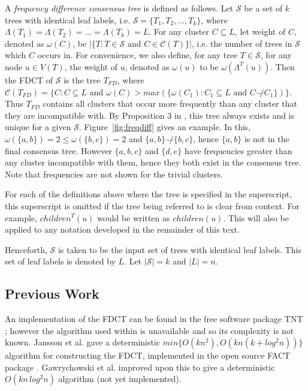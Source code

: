 \documentclass{article}
\newcommand{\compatible}{\smile}
\newcommand{\leafset}{\Lambda}
\newcommand{\weight}{\omega}
\begin{document}
    A \textit{frequency difference consensus tree} is defined as follows. Let $\mathcal{S}$ be a set of $k$ trees with identical leaf labels, i.e. $\mathcal{S} = \{T_1, T_2, ..., T_k\}$, where $\leafset(T_1) = \leafset(T_2) = ... = \leafset(T_k) = L$. For any cluster $C \subseteq L$, let weight of $C$, denoted as $\weight(C)$, be $|\{T : T \in \mathcal{S} \text{ and } C \in \mathcal{C}(T)\}|$, i.e. the number of trees in $\mathcal{S}$ which $C$ occurs in. For convenience, we also define, for any tree $T \in \mathcal{S}$, for any node $u \in V(T)$, the weight of $u$, denoted as $\weight(u)$ to be $\weight(\leafset^{T}(u))$. Then the FDCT of $\mathcal{S}$ is the tree $T_{FD}$, where $\mathcal{C}(T_{FD}) = \{C : C \subseteq L \text{ and } \weight(C) > max(\{\weight(C_1) : C_1 \subseteq L \text{ and } C \not\compatible C_1\})\}$. Thus $T_{FD}$ contains all clusters that occur more frequently than any cluster that they are incompatible with. By Proposition $3$ in \cite{steel2014axiomatic}, this tree always exists and is unique for a given $\mathcal{S}$. Figure~\ref{fig:freqdiff} gives an example. In this, $\weight(\{a, b\}) = 2 \leq \weight(\{b, c\}) = 2$ and $\{a, b\} \not\compatible \{b, c\}$, hence $\{a, b\}$ is not in the final consensus tree. However $\{a, b, c\}$ and $\{d, e\}$ have frequencies greater than any cluster incompatible with them, hence they both exist in the consensus tree. Note that frequencies are not shown for the trivial clusters.

    For each of the definitions above where the tree is specified in the superscript, this superscript is omitted if the tree being referred to is clear from context. For example, $children^T(u)$ would be written as $children(u)$. This will also be applied to any notation developed in the remainder of this text.

    Henceforth, $\mathcal{S}$ is taken to be the input set of trees with identical leaf labels. This set of leaf labels is denoted by $L$. Let $|\mathcal{S}| = k$ and $|L| = n$.

    \subsection{Previous Work}
    An implementation of the FDCT can be found in the free software package TNT \cite{goloboff2008tnt}; however the algorithm used within is unavailable and so its complexity is not known. Jansson et al. \cite{jansson2018algorithms} gave a deterministic $min\{O(kn^2), O(kn(k + log^2 n))\}$ algorithm for constructing the FDCT, implemented in the open source FACT package \cite{jansson2016improved}. Gawrychowski et al. \cite{gawrychowski2017faster} improved upon this to give a deterministic $O(kn\,log^2n)$ algorithm (not yet implemented).
\end{document}
